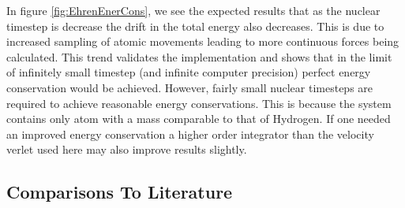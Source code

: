 In figure \ref{fig:EhrenEnerCons}, we see the expected results that as the nuclear timestep is decrease the drift in the total energy also decreases. This is due to increased sampling of atomic movements leading to more continuous forces being calculated. This trend validates the implementation and shows that in the limit of infinitely small timestep (and infinite computer precision) perfect energy conservation would be achieved. However, fairly small nuclear timesteps are required to achieve reasonable energy conservations. This is because the system contains only  atom with a mass comparable to that of Hydrogen. If one needed an improved energy conservation a higher order integrator than the velocity verlet used here may also improve results slightly.

\subsection{Comparisons To Literature}
